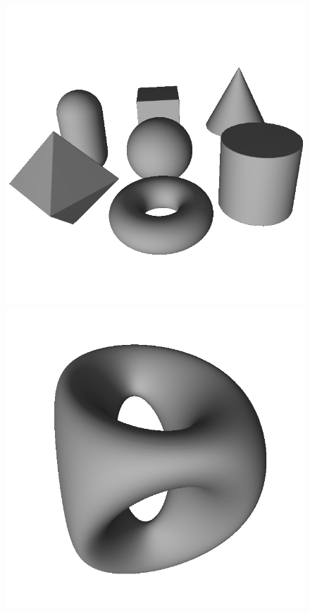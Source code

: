 \documentclass[11pt,twocolumn]{article}
\begin{document}
		\begin{figure}
			\centering
			\resizebox{0.5\textwidth}{!}
			{
				\includegraphics{primitives.png}
				\includegraphics{gen2.png}
}
\end{figure}
\end{document}
